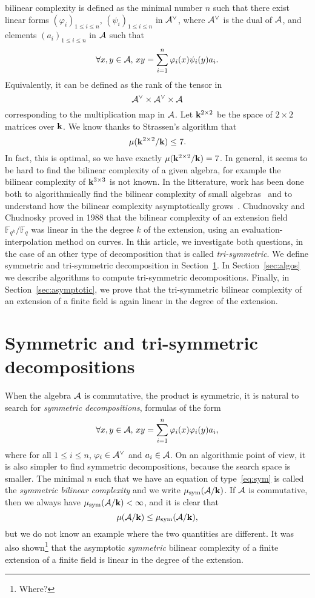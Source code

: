 \documentclass[a4paper,11pt]{article}
\begin{document}
bilinear complexity is defined as the minimal number $n$ such that there exist
linear forms $(\varphi_i)_{1\leq i \leq n}$, $(\psi_i)_{1\leq i \leq n}$ in
$\mathcal{A}^\vee$, where $\mathcal{A}^\vee$ is the dual of $\mathcal{A}$, and
elements $(a_i)_{1\leq i \leq n}$ in $\mathcal{A}$ such that
\begin{equation}
  \forall x, y\in\mathcal{A},\,xy = \sum_{i=1}^{n}\varphi_i(x)\psi_i(y)a_i.
  \label{eq:no-sym}
\end{equation}
Equivalently, it can be defined as the rank of the tensor in
\[
  \mathcal{A}^\vee \times \mathcal{A}^\vee\times \mathcal{A}
\]
corresponding to the multiplication map in $\mathcal{A}$. Let $\mathbf{k}^{2\times2}$ be the space
of $2\times2$ matrices over $\mathbf{k}$. We know thanks to Strassen's algorithm that 
\[
  \mu(\mathbf{k}^{2\times 2}/\mathbf{k}) \leq 7.
\]
In fact, this is optimal, so we have exactly $\mu(\mathbf{k}^{2\times2}/\mathbf{k})=7$. In
general, it seems to be hard to find the bilinear complexity of a given algebra,
for example the bilinear complexity of $\mathbf{k}^{3\times3}$ is not known.
In the litterature, work has been done both to algorithmically find the bilinear complexity of
small algebras~\cite{BDEZ12, Covanov19} and to understand how the bilinear
complexity asymptotically grows~\cite{CC88, BCPRRR19}. Chudnovsky and Chudnosky
proved in 1988 that the bilinear complexity of an extension field
$\mathbb{F}_{q^k}/\mathbb{F}_{q}$ was linear in the the degree $k$ of the
extension, using an evaluation-interpolation method on curves. In this article, we
investigate both questions, in the case of an other type of decomposition that
is called \emph{tri-symmetric}. We define symmetric and tri-symmetric
decomposition in Section~\ref{sec:symtrisym}. In Section~\ref{sec:algos} we
describe algorithms to compute tri-symmetric decompositions. Finally, in
Section~\ref{sec:asymptotic}, we prove that the tri-symmetric bilinear
complexity of an extension of a finite field is again linear in the degree of the
extension.

\section{Symmetric and tri-symmetric decompositions}
\label{sec:symtrisym}

When the algebra $\mathcal{A}$ is commutative, \ie the product is symmetric, it is
natural to search for \emph{symmetric decompositions}, \ie formulas of the form
\begin{equation}
  \forall x, y\in\mathcal{A},\,xy = \sum_{i=1}^{n}\varphi_i(x)\varphi_i(y)a_i,
  \label{eq:sym}
\end{equation}
where for all $1\leq i\leq n$, $\varphi_i\in\mathcal{A}^\vee$ and $a_i\in\mathcal{A}$. On an
algorithmic point of view, it is also simpler to find symmetric decompositions,
because the search space is smaller. The minimal $n$ such that we have an
equation of type~\eqref{eq:sym} is called the \emph{symmetric bilinear
complexity} and we write $\mu_{\text{sym}}(\mathcal{A}/\mathbf{k})$. If $\mathcal{A}$ is commutative, then
we always have $\mu_{\text{sym}}(\mathcal{A}/\mathbf{k})<\infty$, and it is clear that 
\[
  \mu(\mathcal{A}/\mathbf{k})\leq\mu_{\text{sym}}(\mathcal{A}/\mathbf{k}),
\]
but we do not know an example where the two quantities are different.
It was also shown\footnote{Where?} that the
asymptotic \emph{symmetric} bilinear complexity of a finite extension of a
finite field is linear in the degree of the extension.
\end{document}
